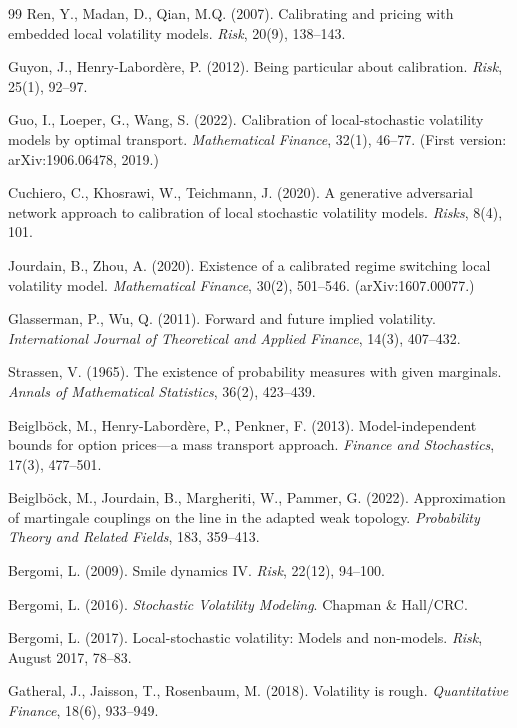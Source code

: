 \documentclass[11pt]{article}
\providecommand{\1}{\mathbf 1}
\begin{document}
{\begin{thebibliography}{99}
Ren, Y., Madan, D., Qian, M.Q. (2007).
Calibrating and pricing with embedded local volatility models.
\textit{Risk}, 20(9), 138--143.

Guyon, J., Henry-Labord\`ere, P. (2012).
Being particular about calibration. \textit{Risk}, 25(1), 92--97.

Guo, I., Loeper, G., Wang, S. (2022).
Calibration of local-stochastic volatility models by optimal transport.
\textit{Mathematical Finance}, 32(1), 46--77. (First version: arXiv:1906.06478, 2019.)

Cuchiero, C., Khosrawi, W., Teichmann, J. (2020).
A generative adversarial network approach to calibration of local stochastic
volatility models. \textit{Risks}, 8(4), 101.

Jourdain, B., Zhou, A. (2020).
Existence of a calibrated regime switching local volatility model.
\textit{Mathematical Finance}, 30(2), 501--546. (arXiv:1607.00077.)

Glasserman, P., Wu, Q. (2011).
Forward and future implied volatility.
\textit{International Journal of Theoretical and Applied Finance}, 14(3), 407--432.

Strassen, V. (1965).
The existence of probability measures with given marginals.
\textit{Annals of Mathematical Statistics}, 36(2), 423--439.

Beiglb\"ock, M., Henry-Labord\`ere, P., Penkner, F. (2013).
Model-independent bounds for option prices---a mass transport approach.
\textit{Finance and Stochastics}, 17(3), 477--501.

Beiglb\"ock, M., Jourdain, B., Margheriti, W., Pammer, G. (2022).
Approximation of martingale couplings on the line in the adapted weak topology.
\textit{Probability Theory and Related Fields}, 183, 359--413.

Bergomi, L. (2009). Smile dynamics IV. \textit{Risk}, 22(12), 94--100.

Bergomi, L. (2016). \textit{Stochastic Volatility Modeling}. Chapman \& Hall/CRC.

Bergomi, L. (2017). Local-stochastic volatility: Models and non-models.
\textit{Risk}, August 2017, 78--83.

Gatheral, J., Jaisson, T., Rosenbaum, M. (2018). Volatility is rough.
\textit{Quantitative Finance}, 18(6), 933--949.


\end{thebibliography}}
\end{document}
